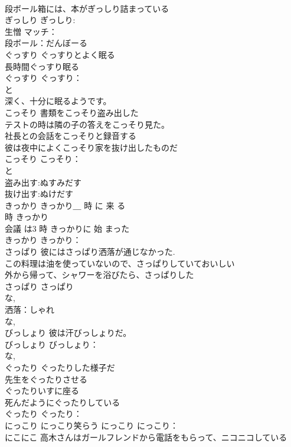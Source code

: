 \documentclass[8pt]{extreport}
\begin{document}
\begin{CJK}{UTF8}{min}
\\	段ボール箱には、本がぎっしり詰まっている 
\\	ぎっしり			ぎっしり:
\\	生憎 マッチ：
\\	段ボール：だんぼーる
\\	ぐっすり	ぐっすりとよく眠る 
\\	長時間ぐっすり眠る 
\\	ぐっすり			ぐっすり：
\\	と 
\\	深く、十分に眠るようです。
\\	こっそり	書類をこっそり盗み出した 
\\	テストの時は隣の子の答えをこっそり見た。 
\\	社長との会話をこっそりと録音する 
\\	彼は夜中によくこっそり家を抜け出したものだ 
\\	こっそり			こっそり：
\\	と 
\\	盗み出す:ぬすみだす
\\	抜け出す:ぬけだす
\\	きっかり	きっかり＿ 時 に 来 る 
\\	時 きっかり 
\\	会議 は3 時 きっかりに 始 まった 
\\	きっかり			きっかり：
\\	さっぱり	彼にはさっぱり洒落が通じなかった. 
\\	この料理は油を使っていないので、さっぱりしていておいしい 
\\	外から帰って、シャワーを浴びたら、さっぱりした 
\\	さっぱり			さっぱり
\\	な, 
\\	洒落：しゃれ
\\	な, 
\\	びっしょり	彼は汗びっしょりだ。 
\\	びっしょり			びっしょり：
\\	な, 
\\	ぐったり	ぐったりした様子だ 
\\	先生をぐったりさせる 
\\	ぐったりいすに座る 
\\	死んだようにぐったりしている 
\\	ぐったり			ぐったり：
\\	にっこり	にっこり笑らう	にっこり			にっこり：
\\	にこにこ	高木さんはガールフレンドから電話をもらって、ニコニコしている 

\end{CJK}
\end{document}
